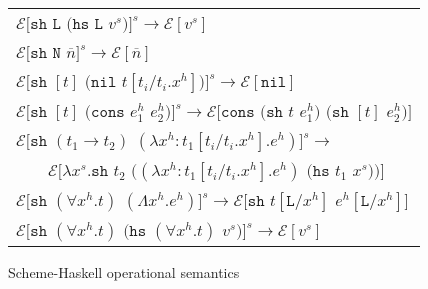 \begin{figure}[p]
\centering
\begin{tabular}{l}

$\mathscr{E}[\mathtt{sh}$ $\mathtt{L}$ $(\mathtt{hs}$ $\mathtt{L}$ $v^s)]^s\rightarrow\mathscr{E}[v^s]$ \\

$\mathscr{E}[\mathtt{sh}$ $\mathtt{N}$ $\overline{n}]^s\rightarrow\mathscr{E}[\overline{n}]$ \\

$\mathscr{E}[\mathtt{sh}$ $[t]$ $(\mathtt{nil}$ $t[t_i/t_i.x^h])]^s\rightarrow\mathscr{E}[\mathtt{nil}]$ \\

$\mathscr{E}[\mathtt{sh}$ $[t]$ $(\mathtt{cons}$ $e^h_1$ $e^h_2)]^s\rightarrow\mathscr{E}[\mathtt{cons}$ $(\mathtt{sh}$ $t$ $e^h_1)$ $(\mathtt{sh}$ $[t]$ $e^h_2)]$ \\

$\mathscr{E}[\mathtt{sh}$ $(t_1\rightarrow t_2)$ $(\lambda x^h:t_1[t_i/t_i.x^h].e^h)]^s\rightarrow$ \\

$\quad\quad\mathscr{E}[\lambda x^s.\mathtt{sh}$ $t_2$ $((\lambda x^h:t_1[t_i/t_i.x^h].e^h)$ $(\mathtt{hs}$ $t_1$ $x^s))]$ \\

$\mathscr{E}[\mathtt{sh}$ $(\forall x^h.t)$ $(\Lambda x^h.e^h)]^s\rightarrow\mathscr{E}[\mathtt{sh}$ $t[\mathtt{L}/x^h]$ $e^h[\mathtt{L}/x^h]]$ \\

$\mathscr{E}[\mathtt{sh}$ $(\forall x^h.t)$ $(\mathtt{hs}$ $(\forall x^h.t)$ $v^s)]^s\rightarrow\mathscr{E}[v^s]$ \\

\end{tabular}
\caption{Scheme-Haskell operational semantics}
\label{shos}
\end{figure}